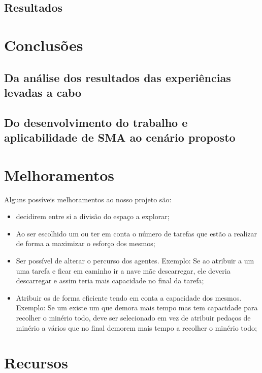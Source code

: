 \documentclass[12pt]{report}
\begin{document}
\section{Resultados}

\chapter{Conclusões}

\section{Da análise dos resultados das experiências levadas a cabo}

\section{Do desenvolvimento do trabalho e aplicabilidade de SMA ao cenário proposto}

\chapter{Melhoramentos}


Alguns possíveis melhoramentos ao nosso projeto são:

\begin{itemize}
	\item \Spotters decidirem entre si a divisão do espaço a explorar;
	\item Ao ser escolhido um \producer ou \transporter ter em conta o número de tarefas que estão a realizar de forma a maximizar o esforço dos mesmos;
	\item Ser possível de alterar o percurso dos agentes. Exemplo: Se ao atribuir a um \transporter uma tarefa e ficar em caminho ir a nave mãe descarregar, ele deveria descarregar e assim teria mais capacidade no final da tarefa;
	\item Atribuir os \transporters de forma eficiente tendo em conta a capacidade dos mesmos. Exemplo: Se um existe um \transporter que demora mais tempo mas tem capacidade para recolher o minério todo, deve ser selecionado em vez de atribuir pedaços de minério a vários \transporters que no final demorem mais tempo a recolher o minério todo;
\end{itemize}

\chapter{Recursos}
\end{document}
